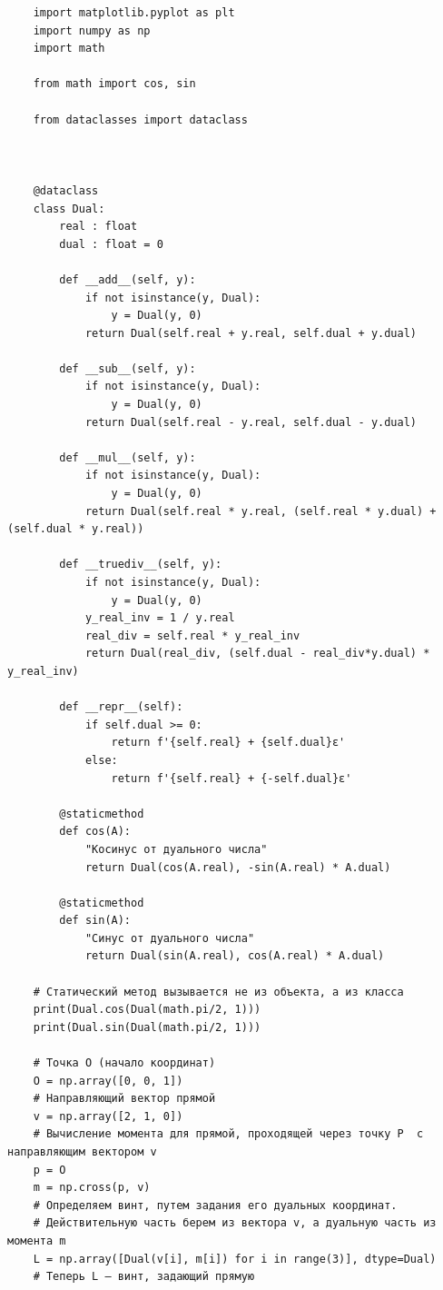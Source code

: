 \begin{verbatim}
    import matplotlib.pyplot as plt
    import numpy as np
    import math

    from math import cos, sin

    from dataclasses import dataclass



    @dataclass
    class Dual:
        real : float       
        dual : float = 0   
            
        def __add__(self, y):
            if not isinstance(y, Dual):
                y = Dual(y, 0)
            return Dual(self.real + y.real, self.dual + y.dual)
        
        def __sub__(self, y):
            if not isinstance(y, Dual):
                y = Dual(y, 0)        
            return Dual(self.real - y.real, self.dual - y.dual)
        
        def __mul__(self, y):
            if not isinstance(y, Dual):
                y = Dual(y, 0)        
            return Dual(self.real * y.real, (self.real * y.dual) + (self.dual * y.real))
        
        def __truediv__(self, y):
            if not isinstance(y, Dual):
                y = Dual(y, 0)        
            y_real_inv = 1 / y.real
            real_div = self.real * y_real_inv
            return Dual(real_div, (self.dual - real_div*y.dual) * y_real_inv)

        def __repr__(self):
            if self.dual >= 0:
                return f'{self.real} + {self.dual}ε'
            else: 
                return f'{self.real} + {-self.dual}ε'

        @staticmethod
        def cos(A):
            "Косинус от дуального числа"
            return Dual(cos(A.real), -sin(A.real) * A.dual)

        @staticmethod
        def sin(A):
            "Синус от дуального числа"
            return Dual(sin(A.real), cos(A.real) * A.dual)

    # Статический метод вызывается не из объекта, а из класса
    print(Dual.cos(Dual(math.pi/2, 1)))
    print(Dual.sin(Dual(math.pi/2, 1)))

    # Точка O (начало координат)  
    O = np.array([0, 0, 1])
    # Направляющий вектор прямой
    v = np.array([2, 1, 0])
    # Вычисление момента для прямой, проходящей через точку P  с направляющим вектором v
    p = O
    m = np.cross(p, v)
    # Определяем винт, путем задания его дуальных координат.
    # Действительную часть берем из вектора v, а дуальную часть из момента m
    L = np.array([Dual(v[i], m[i]) for i in range(3)], dtype=Dual)
    # Теперь L — винт, задающий прямую


\end{verbatim}

